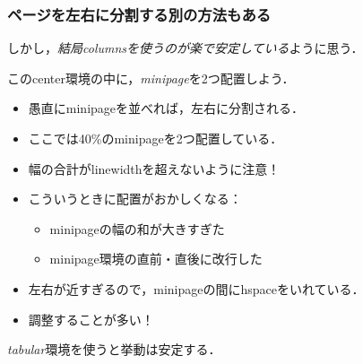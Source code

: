 \documentclass[unicode, 9pt, aspectratio=169]{beamer}
\begin{document}
\begin{frame}
  \frametitle{ページを左右に分割する別の方法もある}
  しかし，\emph{結局columnsを使うのが楽で安定している}ように思う．

  \begin{center}
    このcenter環境の中に，\emph{minipage}を2つ配置しよう．
    \vspace{-8pt}

    \hrulefill{}

    \begin{minipage}{.4\linewidth}
      \begin{itemize}
        \item 愚直にminipageを並べれば，左右に分割される．
        \item ここでは40\%のminipageを2つ配置している．
        \item 幅の合計がlinewidthを超えないように注意！
      \end{itemize}
    \end{minipage}
    \hspace{12pt}
    \begin{minipage}{.4\linewidth}
      \begin{itemize}
        \item こういうときに配置がおかしくなる：
          \begin{itemize}
            \item minipageの幅の和が大きすぎた
            \item minipage環境の直前・直後に改行した
          \end{itemize}
        \item 左右が近すぎるので，minipageの間にhspaceをいれている．
        \item[{\(\to \)}] 調整することが多い！
      \end{itemize}
    \end{minipage}
  \end{center}

  \hrulefill{}
  \begin{center}
    \emph{tabular}環境を使うと挙動は安定する．
    \vspace{-8pt}

    \hrulefill{}


\end{center}
\end{frame}
\end{document}
